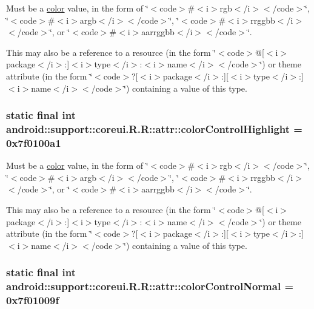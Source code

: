 Must be a \hyperlink{classandroid_1_1support_1_1coreui_1_1_r_1_1color}{color} value, in the form of \char`\"{}$<$code$>$\#$<$i$>$rgb$<$/i$>$$<$/code$>$\char`\"{}, \char`\"{}$<$code$>$\#$<$i$>$argb$<$/i$>$$<$/code$>$\char`\"{}, \char`\"{}$<$code$>$\#$<$i$>$rrggbb$<$/i$>$$<$/code$>$\char`\"{}, or \char`\"{}$<$code$>$\#$<$i$>$aarrggbb$<$/i$>$$<$/code$>$\char`\"{}. 

This may also be a reference to a resource (in the form \char`\"{}$<$code$>$@\mbox{[}$<$i$>$package$<$/i$>$:\mbox{]}$<$i$>$type$<$/i$>$:$<$i$>$name$<$/i$>$$<$/code$>$\char`\"{}) or theme attribute (in the form \char`\"{}$<$code$>$?\mbox{[}$<$i$>$package$<$/i$>$:\mbox{]}\mbox{[}$<$i$>$type$<$/i$>$:\mbox{]}$<$i$>$name$<$/i$>$$<$/code$>$\char`\"{}) containing a value of this type. \hypertarget{classandroid_1_1support_1_1coreui_1_1_r_1_1attr_d723b5b6cf28527d4087cb8b98f487c2}{
\subsubsection[{colorControlHighlight}]{\setlength{\rightskip}{0pt plus 5cm}static final int android::support::coreui.R.R::attr::colorControlHighlight = 0x7f0100a1}}
\label{classandroid_1_1support_1_1coreui_1_1_r_1_1attr_d723b5b6cf28527d4087cb8b98f487c2}


Must be a \hyperlink{classandroid_1_1support_1_1coreui_1_1_r_1_1color}{color} value, in the form of \char`\"{}$<$code$>$\#$<$i$>$rgb$<$/i$>$$<$/code$>$\char`\"{}, \char`\"{}$<$code$>$\#$<$i$>$argb$<$/i$>$$<$/code$>$\char`\"{}, \char`\"{}$<$code$>$\#$<$i$>$rrggbb$<$/i$>$$<$/code$>$\char`\"{}, or \char`\"{}$<$code$>$\#$<$i$>$aarrggbb$<$/i$>$$<$/code$>$\char`\"{}. 

This may also be a reference to a resource (in the form \char`\"{}$<$code$>$@\mbox{[}$<$i$>$package$<$/i$>$:\mbox{]}$<$i$>$type$<$/i$>$:$<$i$>$name$<$/i$>$$<$/code$>$\char`\"{}) or theme attribute (in the form \char`\"{}$<$code$>$?\mbox{[}$<$i$>$package$<$/i$>$:\mbox{]}\mbox{[}$<$i$>$type$<$/i$>$:\mbox{]}$<$i$>$name$<$/i$>$$<$/code$>$\char`\"{}) containing a value of this type. \hypertarget{classandroid_1_1support_1_1coreui_1_1_r_1_1attr_93d7c460e4a7c03c9a6311de5db311bb}{
\subsubsection[{colorControlNormal}]{\setlength{\rightskip}{0pt plus 5cm}static final int android::support::coreui.R.R::attr::colorControlNormal = 0x7f01009f}}
\label{classandroid_1_1support_1_1coreui_1_1_r_1_1attr_93d7c460e4a7c03c9a6311de5db311bb}


